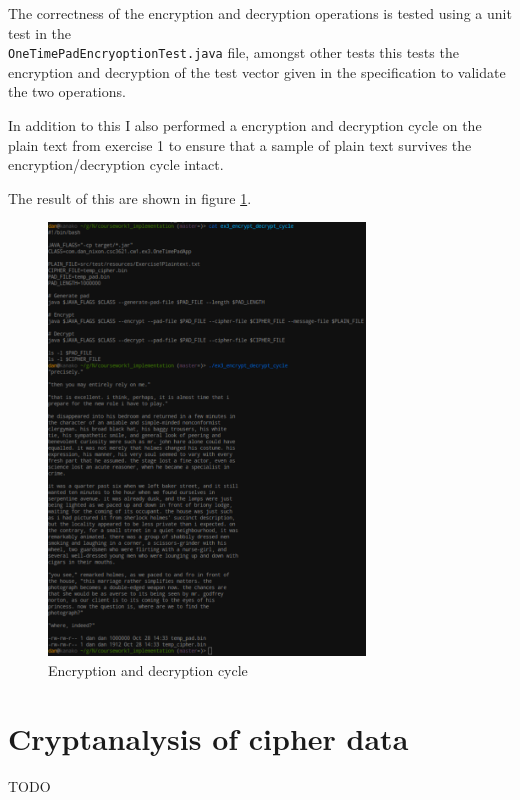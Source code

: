 \documentclass[a4paper]{article}
\begin{document}
The correctness of the encryption and decryption operations is tested using a
unit test in the \\ \texttt{OneTimePadEncryoptionTest.java} file, amongst other
tests this tests the encryption and decryption of the test vector given in the
specification to validate the two operations.

In addition to this I also performed a encryption and decryption cycle on the
plain text from exercise 1 to ensure that a sample of plain text survives the
encryption/decryption cycle intact.

The result of this are shown in figure \ref{fig:enc_dec_cycle}.

\begin{figure}[h!]
  \centering
  \includegraphics[width=0.75\textwidth]{graphics/ex3_enc_dec_cycle.eps}
  \caption{Encryption and decryption cycle}
  \label{fig:enc_dec_cycle}
\end{figure}

\section{Cryptanalysis of cipher data}

TODO
\end{document}

